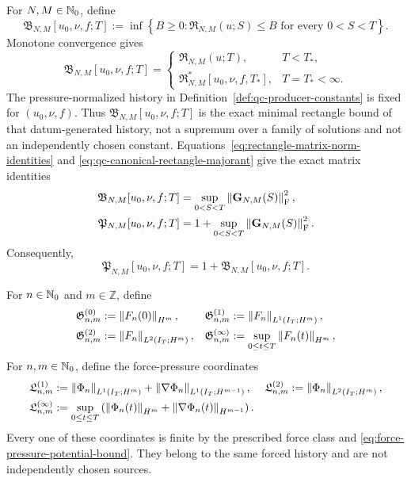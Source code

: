 \begin{definition}
\label{def:qc-canonical-majorants}
For \(N,M\in\mathbb N_0\), define
\begin{equation}
 \mathfrak B_{N,M}[u_0,\nu,f;T]
 :=\inf\left\{B\ge0:
 \mathfrak R_{N,M}(u;S)\le B
 \text{ for every }0<S<T\right\}.
 \label{eq:qc-canonical-rectangle-majorant}
\end{equation}
Monotone convergence gives
\begin{equation}
 \mathfrak B_{N,M}[u_0,\nu,f;T]
 =\begin{cases}
   \mathfrak R_{N,M}(u;T),&T<T_*,\\
   \mathfrak R_{N,M}^*[u_0,\nu,f,T_*],&T=T_*<\infty.
  \end{cases}
 \label{eq:qc-canonical-rectangle-identification}
\end{equation}
The pressure-normalized history in
Definition~\ref{def:qc-producer-constants} is fixed for \((u_0,\nu,f)\).
Thus
\(\mathfrak B_{N,M}[u_0,\nu,f;T]\) is the exact minimal rectangle bound of
that datum-generated history, not a supremum over a family of solutions and
not an independently chosen constant.
Equations~\eqref{eq:rectangle-matrix-norm-identities} and
\eqref{eq:qc-canonical-rectangle-majorant} give the exact matrix identities
\begin{align}
 \mathfrak B_{N,M}[u_0,\nu,f;T]
 &=\sup_{0<S<T}\left\lVert \mathbf G_{N,M}(S)\right\rVert_{\mathrm F}^2,
 \label{eq:qc-B-matrix-identity}\\
 \mathfrak P_{N,M}[u_0,\nu,f;T]
 &=1+\sup_{0<S<T}\left\lVert \mathbf G_{N,M}(S)\right\rVert_{\mathrm F}^2.
 \label{eq:qc-P-matrix-identity}
\end{align}
Consequently,
\begin{equation}
 \mathfrak P_{N,M}[u_0,\nu,f;T]
 =1+\mathfrak B_{N,M}[u_0,\nu,f;T].
 \label{eq:qc-producer-through-B}
\end{equation}

For \(n\in\mathbb N_0\) and \(m\in\mathbb Z\), define
\begin{align}
 \mathfrak G^{(0)}_{n,m}
 &:=\left\lVert F_n(0)\right\rVert_{H^m},
 &
 \mathfrak G^{(1)}_{n,m}
 &:=\left\lVert F_n\right\rVert_{L^1(I_T;H^m)},
 \notag\\
 \mathfrak G^{(2)}_{n,m}
 &:=\left\lVert F_n\right\rVert_{L^2(I_T;H^m)},
 &
 \mathfrak G^{(\infty)}_{n,m}
 &:=\sup_{0\le t\le T}\left\lVert F_n(t)\right\rVert_{H^m},
 \label{eq:qc-force-row-majorants}
\end{align}
For \(n,m\in\mathbb N_0\), define the force-pressure coordinates
\begin{align}
 \mathfrak L^{(1)}_{n,m}
 &:=\left\lVert \Phi_n\right\rVert_{L^1(I_T;H^m)}
   +\left\lVert \nabla\Phi_n\right\rVert_{L^1(I_T;H^{m-1})},
 &
 \mathfrak L^{(2)}_{n,m}
 &:=\left\lVert \Phi_n\right\rVert_{L^2(I_T;H^m)},
 \notag\\
 \mathfrak L^{(\infty)}_{n,m}
 &:=\sup_{0\le t\le T}\left(
 \left\lVert \Phi_n(t)\right\rVert_{H^m}
 +\left\lVert \nabla\Phi_n(t)\right\rVert_{H^{m-1}}\right).
 \label{eq:qc-force-pressure-majorants}
\end{align}
Every one of these coordinates is finite by the prescribed force class and
\eqref{eq:force-pressure-potential-bound}.  They belong to the same forced
history and are not independently chosen sources.


\end{definition}
